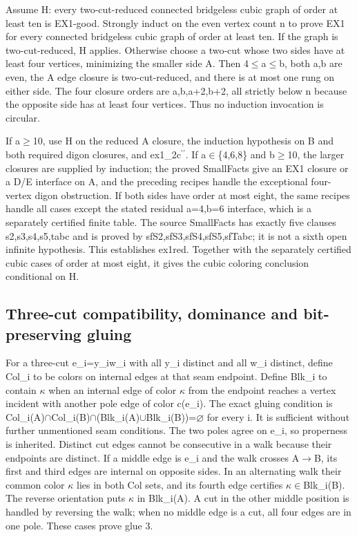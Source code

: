 \documentclass[11pt,a4paper]{article}
\begin{document}
Assume H: every two-cut-reduced connected bridgeless cubic graph of order at least ten is EX1-good. Strongly induct on the even vertex count n to prove EX1 for every connected bridgeless cubic graph of order at least ten. If the graph is two-cut-reduced, H applies. Otherwise choose a two-cut whose two sides have at least four vertices, minimizing the smaller side A. Then 4\ensuremath{\leq}a\ensuremath{\leq}b, both a,b are even, the A edge closure is two-cut-reduced, and there is at most one rung on either side. The four closure orders are a,b,a+2,b+2, all strictly below n because the opposite side has at least four vertices. Thus no induction invocation is circular.

If a\ensuremath{\geq}10, use H on the reduced A closure, the induction hypothesis on B and both required digon closures, and ex1\_2c\ensuremath{^{\prime\prime}}. If a\ensuremath{\in}\{4,6,8\} and b\ensuremath{\geq}10, the larger closures are supplied by induction; the proved SmallFacts give an EX1 closure or a D/E interface on A, and the preceding recipes handle the exceptional four-vertex digon obstruction. If both sides have order at most eight, the same recipes handle all cases except the stated residual a=4,b=6 interface, which is a separately certified finite table. The source SmallFacts has exactly five clauses s2,s3,s4,s5,tabc and is proved by sfS2,sfS3,sfS4,sfS5,sfTabc; it is not a sixth open infinite hypothesis. This establishes ex1red. Together with the separately certified cubic cases of order at most eight, it gives the cubic coloring conclusion conditional on H.

\subsection{Three-cut compatibility, dominance and bit-preserving gluing}
For a three-cut e\_i=y\_iw\_i with all y\_i distinct and all w\_i distinct, define Col\_i to be colors on internal edges at that seam endpoint. Define Blk\_i to contain \ensuremath{\kappa} when an internal edge of color \ensuremath{\kappa} from the endpoint reaches a vertex incident with another pole edge of color c(e\_i). The exact gluing condition is Col\_i(A)\ensuremath{\cap}Col\_i(B)\ensuremath{\cap}(Blk\_i(A)\ensuremath{\cup}Blk\_i(B))=\ensuremath{\varnothing} for every i. It is sufficient without further unmentioned seam conditions. The two poles agree on e\_i, so properness is inherited. Distinct cut edges cannot be consecutive in a walk because their endpoints are distinct. If a middle edge is e\_i and the walk crosses A\ensuremath{\to}B, its first and third edges are internal on opposite sides. In an alternating walk their common color \ensuremath{\kappa} lies in both Col sets, and its fourth edge certifies \ensuremath{\kappa}\ensuremath{\in}Blk\_i(B). The reverse orientation puts \ensuremath{\kappa} in Blk\_i(A). A cut in the other middle position is handled by reversing the walk; when no middle edge is a cut, all four edges are in one pole. These cases prove glue 3.
\end{document}
